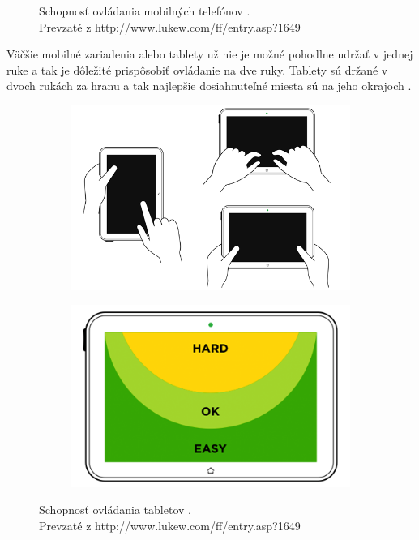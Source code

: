 \begin{figure}[H]
        \caption[Schopnosť ovládania mobilných telefónov]{Schopnosť ovládania mobilných telefónov \cite{navigation}.\\
		Prevzaté z http://www.lukew.com/ff/entry.asp?1649}
		\label{fig:tnavphones}
\end{figure}

Väčšie mobilné zariadenia alebo tablety už nie je možné pohodlne udržať v jednej ruke a tak je dôležité prispôsobiť ovládanie na dve ruky. Tablety sú držané v dvoch rukách za hranu a tak najlepšie dosiahnuteľné miesta sú na jeho okrajoch \cite{mobilebooktouch}.

\begin{figure}[H]
        \centering
        \begin{subfigure}[b]{0.6\textwidth}
                \centering
                \includegraphics[width=\textwidth]{img/tnav-touch-tablets.png}
        \end{subfigure}%
        \begin{subfigure}[b]{0.4\textwidth}
                \centering
                \includegraphics[width=\textwidth]{img/tnav-touch-tablets2.png}
        \end{subfigure}

        \caption[Schopnosť ovládania tabletov]{Schopnosť ovládania tabletov \cite{navigation}.\\
		Prevzaté z http://www.lukew.com/ff/entry.asp?1649}
		\label{fig:tnavtablets2}
\end{figure}

